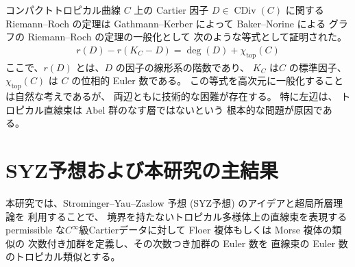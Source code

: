 \documentclass[uplatex,dvipdfmx,12pt]{jsarticle}
\numberwithin{equation}{section}
\theoremstyle{definition}
\newcommand{\opn}[1]{\operatorname{#1}}
\newcommand{\beforesection}{\vspace{-15pt}}
\newcommand{\aftersection}{\vspace{-8pt}}
\begin{document}
コンパクトトロピカル曲線 $C$ 上の Cartier 因子 
$D\in \opn{CDiv}(C)$
に関する Riemann--Roch の定理は
Gathmann--Kerber
\cite{gathmannRiemannRochTheoremTropical2008a} によって 
Baker--Norine による
グラフの Riemann--Roch の定理の一般化として
次のような等式として証明された。
\begin{align} \label{equation-tropical-rr}
r(D)-r(K_C-D)=\opn{deg}(D)+\chi_{\mathrm{top}}(C)
\end{align}
ここで、$r(D)$ とは、$D$ の因子の線形系の階数であり、
$K_C$ は$C$ の標準因子、$\chi_{\mathrm{top}}(C)$ は
$C$ の位相的 Euler 数である。
この等式を高次元に一般化することは自然な考えであるが、
両辺ともに技術的な困難が存在する。
特に左辺は、
トロピカル直線束は Abel 群のなす層ではないという
根本的な問題が原因である。

\beforesection

\section{SYZ予想および本研究の主結果}

\aftersection

本研究では、Strominger--Yau--Zaslow 予想 (SYZ予想)
のアイデアと超局所層理論\cite{MR1299726}を
利用することで、
境界を持たないトロピカル多様体上の直線束を表現する 
permissible な$C^{\infty}$級Cartierデータに対して
Floer 複体もしくは Morse 複体の類似の
次数付き加群を定義し、その次数つき加群の 
Euler 数を 直線束の Euler 数のトロピカル類似とする。
\end{document}
